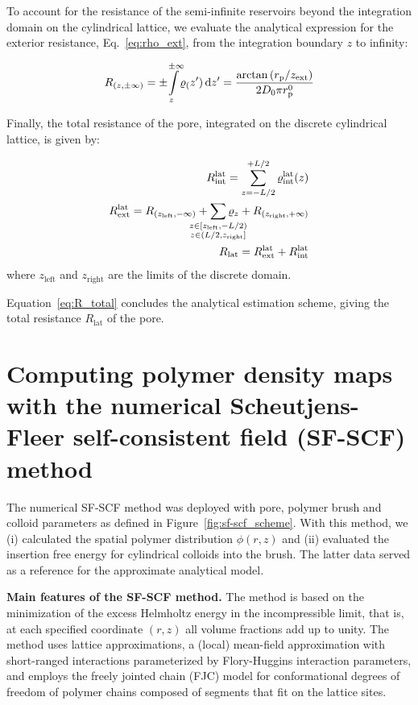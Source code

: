 \documentclass[10pt, a4paper, twocolumn]{article}
\begin{document}
To account for the resistance of the semi-infinite reservoirs beyond the integration domain on the cylindrical lattice, we evaluate the analytical expression for the exterior resistance, Eq.~\eqref{eq:rho_ext}, from the integration boundary $z$ to infinity:

\begin{eqnarray}
    \label{eq:r_reservoir}
    R_{(z, \pm\infty)} = \pm\!\! \int\displaylimits_{z}^{\pm\infty}\!\! \varrho_(z') \, \text{d}z' = \frac{\arctan\left({r_{\text{p}}}/{z_{\text{ext}}} \right)}{2 D_0 \pi r_{\text{p}}^{0}}
\end{eqnarray}

Finally, the total resistance of the pore, integrated on the discrete cylindrical lattice, is given by:

\begin{eqnarray}
    R_{\text{int}}^{\text{lat}} = \sum_{z=-L/2}^{+L/2} \varrho_{\text{int}}^{\text{lat}}(z)
    \\
    R_{\text{ext}}^{\text{lat}} = R_{(z_{\text{left}}, -\infty)} + \sum\limits_{\mathclap{\substack{z \in [z_{\text{left}},-L/2)\\z \in (L/2, z_\text{right}]}}} \varrho_{z} + R_{(z_{\text{right}}, +\infty)}
    \\
    \label{eq:R_total}
    R_{\text{lat}} = R_{\text{ext}}^{\text{lat}} + R_{\text{int}}^{\text{lat}}
\end{eqnarray}
where $z_{\text{left}}$ and $z_{\text{right}}$ are the limits of the discrete domain.

Equation~\eqref{eq:R_total} concludes the analytical estimation scheme, giving the total resistance $R_{\text{lat}}$ of the pore.


\pagebreak
\section{Computing polymer density maps with the numerical Scheutjens-Fleer self-consistent field (SF-SCF) method}

The numerical SF-SCF method was deployed with pore, polymer brush and colloid parameters as defined in Figure~\ref{fig:sf-scf_scheme}.
With this method, we (i) calculated the spatial polymer distribution $\phi(r,z)$ and (ii) evaluated the insertion free energy for cylindrical colloids into the brush.
The latter data served as a reference for the approximate analytical model.

\bigskip\noindent
\textbf{Main features of the SF-SCF method.}
The method is based on the minimization of the excess Helmholtz energy in the incompressible limit, that is, at each specified coordinate $(r,z)$ all volume fractions add up to unity.
The method uses lattice approximations, a (local) mean-field approximation with short-ranged interactions parameterized by Flory-Huggins interaction parameters, and employs the freely jointed chain (FJC) model for conformational degrees of freedom of polymer chains composed of segments that fit on the lattice sites. 
\end{document}
